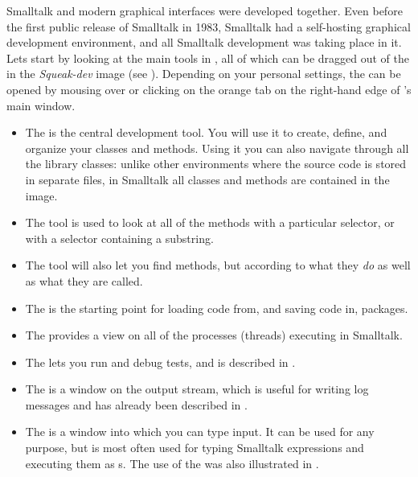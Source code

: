 \documentclass[a4paper,10pt,twoside]{book}
\begin{document}
Smalltalk and modern graphical interfaces were developed together.
Even before the first public release of Smalltalk in 1983, Smalltalk had a self-hosting graphical development environment, and all Smalltalk development was taking place in it.
Lets start by looking at the main tools in \Squeak, all of which can be dragged out of the \toolsflapind in the \emph{Squeak-dev} image (see ).
Depending on your personal settings, the \toolsflap{} can be opened by mousing over or clicking on the orange tab on the right-hand edge of \Squeak's main window.

\begin{itemize}
	\item {The } is the central development tool. You will use it to create, define, and organize your classes and methods. Using it you can also navigate through all the library classes: unlike other environments where the source code is stored in separate files, in Smalltalk all classes and methods are contained in the image.

	\item{The } tool is used to look at all of the methods with a particular selector, or with a selector containing a substring.
	
	\item{The } tool will also let you find methods, but according to what they \emph{do} as well as what they are called.
	
	\item{The } is the starting point for loading code from, and saving code in,  packages.
	
	\item{The  provides a view on all of the processes (threads) executing in Smalltalk.}
	
	\item{The } lets you run and debug \SUnit tests, and is described in .
	
	\item{The } is a window on the  output stream, which is useful for writing log messages and has already been described in .
	
	\item{The } is a window into which you can type input.  
	It can be used for any purpose, but is most often used for typing Smalltalk expressions and 
	executing them as s. The use of the  was also illustrated in .
\end{itemize}
\end{document}
